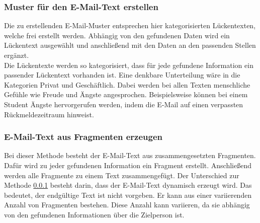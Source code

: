 		\subsubsection{Muster für den E-Mail-Text erstellen}
		\label{subsubsec:EMailMusterMethode}
		Die zu erstellenden E-Mail-Muster entsprechen hier kategorisierten Lückentexten, welche frei erstellt werden. Abhängig von den gefundenen Daten wird ein Lückentext ausgewählt und anschließend mit den Daten an den passenden Stellen ergänzt.\\
		Die Lückentexte werden so kategorisiert, dass für jede gefundene Information ein passender Lückentext vorhanden ist. Eine denkbare Unterteilung wäre in die Kategorien Privat und Geschäftlich. Dabei werden bei allen Texten menschliche Gefühle wie Freude und Ängste angesprochen. Beispielsweise können bei einem Student Ängste hervorgerufen werden, indem die E-Mail auf einen verpassten Rückmeldezeitraum hinweist.
	
		\subsubsection{E-Mail-Text aus Fragmenten erzeugen}
		\label{subsubsec:EMailTextFragment}
		Bei dieser Methode besteht der E-Mail-Text aus zusammengesetzten Fragmenten. Dafür wird zu jeder gefundenen Information ein Fragment erstellt. Anschließend werden alle Fragmente zu einem Text zusammengefügt. Der Unterschied zur Methode \ref{subsubsec:EMailMusterMethode} besteht darin, dass der E-Mail-Text dynamisch erzeugt wird. Das bedeutet, der endgültige Text ist nicht vorgeben. Er kann aus einer variierenden Anzahl von Fragmenten bestehen. Diese Anzahl kann variieren, da sie abhängig von den gefundenen Informationen über die Zielperson ist.
		
		
		

